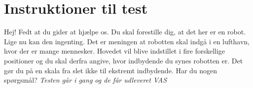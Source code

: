 \section{Instruktioner til test}
\label{APP:Instruktioner}
Hej!\blankline
%
Fedt at du gider at hjælpe os. Du skal forestille dig, at det her er en robot. Lige nu kan den ingenting. Det er meningen at robotten skal indgå i en lufthavn, hvor der er mange mennesker. Hovedet vil blive indstillet i fire forskellige positioner og du skal derfra angive, hvor indbydende du synes robotten er. Det gør du på en skala fra slet ikke til ekstremt indbydende.\blankline
%
Har du nogen spørgsmål?\blankline
%
\textit{Testen går i gang og de får udleveret VAS}


%

